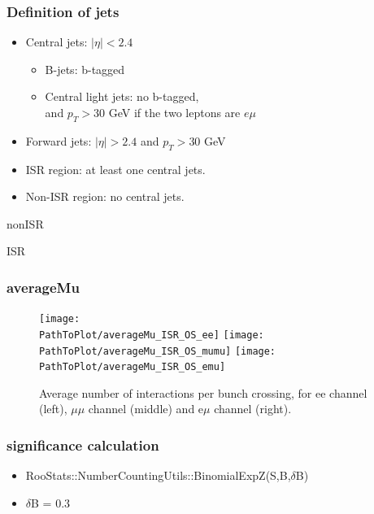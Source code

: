 \documentclass[mathserif,serif]{beamer}
\begin{document}
\begin{frame}
\frametitle{Definition of jets}
\normalsize
\begin{itemize}
\item Central jets: $|\eta|<2.4$
\begin{itemize}
\item B-jets: b-tagged
\item Central light jets: no b-tagged,\\
and $p_T>30$ GeV if the two leptons are $e\mu$
\end{itemize}
\item Forward jets: $|\eta|>2.4$ and $p_T>30$ GeV
\item ISR region: at least one central jets.
\item Non-ISR region: no central jets.
\end{itemize}
\end{frame}

\begin{frame}
\begin{center}
\huge
nonISR
\end{center}
\end{frame}




\begin{frame}
\begin{center}
\huge
ISR
\end{center}
\end{frame}




\def \PathToPlot {../plot}
\begin{frame}
\frametitle{averageMu}
\begin{figure}
\texttt{[image: \\PathToPlot/averageMu\_ISR\_OS\_ee]}
\texttt{[image: \\PathToPlot/averageMu\_ISR\_OS\_mumu]}
\texttt{[image: \\PathToPlot/averageMu\_ISR\_OS\_emu]} \\
\caption{Average number of interactions per bunch crossing, for ee channel (left), $\mu\mu$ channel (middle) and e$\mu$ channel (right).}
\end{figure}
\end{frame}

\begin{frame}
\frametitle{significance calculation}
\begin{itemize}
\item RooStats::NumberCountingUtils::BinomialExpZ(S,B,$\delta$B)
\item $\delta$B = 0.3
\end{itemize}
\end{frame}
\end{document}
